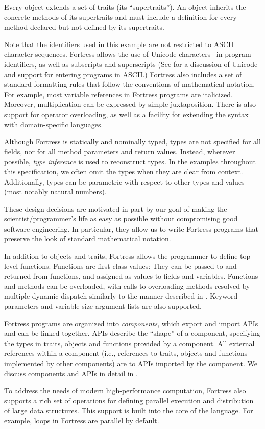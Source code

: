 Every object extends a set of traits (its ``supertraits'').
An object inherits the concrete methods of its supertraits
and must include a definition for every method
declared but not defined by its supertraits.

Note that the identifiers used in this example
are not restricted to ASCII character sequences.
Fortress allows the use of Unicode characters~\cite{Unicode}
in program identifiers, as well as subscripts and superscripts
(See  for a discussion
of Unicode and support for entering programs in
ASCII.)
Fortress also includes a set of standard formatting rules
that follow the conventions of mathematical notation. For example,
most variable references in Fortress programs are italicized.
Moreover, multiplication
can be expressed by simple juxtaposition.
There is also support for operator overloading,
as well as a facility for  extending
the syntax with domain-specific languages.

Although Fortress is statically and nominally typed,
types are not specified for all fields,
nor for all method parameters and return values.
Instead, wherever possible,
\emph{type inference}
is used
to reconstruct types.
In the examples throughout this specification,
we often omit the types when they are clear from context.
Additionally, types can be parametric with respect to other
types and values (most notably natural numbers).

These design decisions are motivated in part
by our goal
of making the scientist/programmer's life as easy as possible
without compromising good software engineering.
In particular,
they allow us to write Fortress programs
that preserve the look of standard
mathematical notation.

In addition to objects and traits,
Fortress allows the programmer to define top-level functions.
Functions are first-class values:
They can be passed to and returned from functions,
and assigned as values to fields and variables.
Functions and methods can be overloaded, with calls
to overloading methods resolved by multiple dynamic dispatch
similarly to the manner described in \cite{MillsteinChambers}.
\label{nutshellKwd}
Keyword parameters and variable size argument lists
are also supported.



Fortress programs are organized into
\emph{components},
which export and import APIs
and can be linked together.
APIs describe the ``shape'' of a component,
specifying the types in traits, objects and functions
provided by a component.
All external references within a component
(i.e., references to traits, objects and functions
implemented by other components)
are to APIs imported by the component.
We discuss components and APIs in detail
in .

To address the needs of modern high-performance computation,
Fortress also supports a rich set of operations for defining parallel execution
and distribution
of large data structures. This support is built into the core of the language.
For example,  loops in Fortress are parallel by default.
